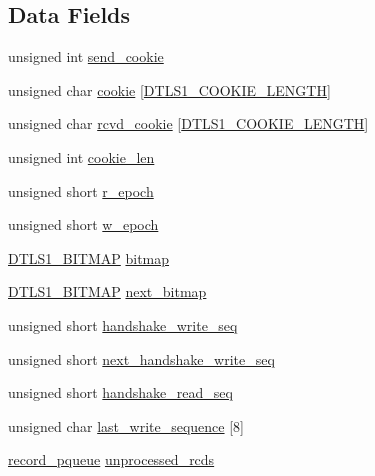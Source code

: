 \subsection*{Data Fields}
\begin{DoxyCompactItemize}
\item 
unsigned int \hyperlink{structdtls1__state__st_a4fa0086728c4e03c5d639277623600c6}{send\+\_\+cookie}
\item 
unsigned char \hyperlink{structdtls1__state__st_a7090afa8219b648fd2b705181f12fc43}{cookie} \mbox{[}\hyperlink{ssl_2dtls1_8h_a5c451434dd0ce6f73bd2cf57134ee864}{D\+T\+L\+S1\+\_\+\+C\+O\+O\+K\+I\+E\+\_\+\+L\+E\+N\+G\+TH}\mbox{]}
\item 
unsigned char \hyperlink{structdtls1__state__st_adacbbad05ef98a7e7d95a80489b881d0}{rcvd\+\_\+cookie} \mbox{[}\hyperlink{ssl_2dtls1_8h_a5c451434dd0ce6f73bd2cf57134ee864}{D\+T\+L\+S1\+\_\+\+C\+O\+O\+K\+I\+E\+\_\+\+L\+E\+N\+G\+TH}\mbox{]}
\item 
unsigned int \hyperlink{structdtls1__state__st_aec4ae4ad8721cbafacce32fa1e74fc1a}{cookie\+\_\+len}
\item 
unsigned short \hyperlink{structdtls1__state__st_ae1b74cab8785d2f5f104ca784bd4feac}{r\+\_\+epoch}
\item 
unsigned short \hyperlink{structdtls1__state__st_a07f814f5c84eeeb5692055b2ca77bc02}{w\+\_\+epoch}
\item 
\hyperlink{include_2openssl_2dtls1_8h_a7c7329402802de09daba80b9c492e8dc}{D\+T\+L\+S1\+\_\+\+B\+I\+T\+M\+AP} \hyperlink{structdtls1__state__st_a20cdb990d84c97f9a43bd72f9b04e892}{bitmap}
\item 
\hyperlink{include_2openssl_2dtls1_8h_a7c7329402802de09daba80b9c492e8dc}{D\+T\+L\+S1\+\_\+\+B\+I\+T\+M\+AP} \hyperlink{structdtls1__state__st_a2c9ef3fa9fe22648a8d478ef3209748f}{next\+\_\+bitmap}
\item 
unsigned short \hyperlink{structdtls1__state__st_af54dde18bf5320413ac47b7afeec89fc}{handshake\+\_\+write\+\_\+seq}
\item 
unsigned short \hyperlink{structdtls1__state__st_a0a3aef30ca9552d12dc99252dcbc7a9b}{next\+\_\+handshake\+\_\+write\+\_\+seq}
\item 
unsigned short \hyperlink{structdtls1__state__st_a2626ecf26d6b86fb75980b2c5dda4dc0}{handshake\+\_\+read\+\_\+seq}
\item 
unsigned char \hyperlink{structdtls1__state__st_a8ed568b8fe49df93598b4dcb39ee4c3f}{last\+\_\+write\+\_\+sequence} \mbox{[}8\mbox{]}
\item 
\hyperlink{include_2openssl_2dtls1_8h_aac9fce3ec0c12051ecb4de0e531747f8}{record\+\_\+pqueue} \hyperlink{structdtls1__state__st_a3b9c346ebe7a3f53056ee6837f9f928d}{unprocessed\+\_\+rcds}

\end{DoxyCompactItemize}
